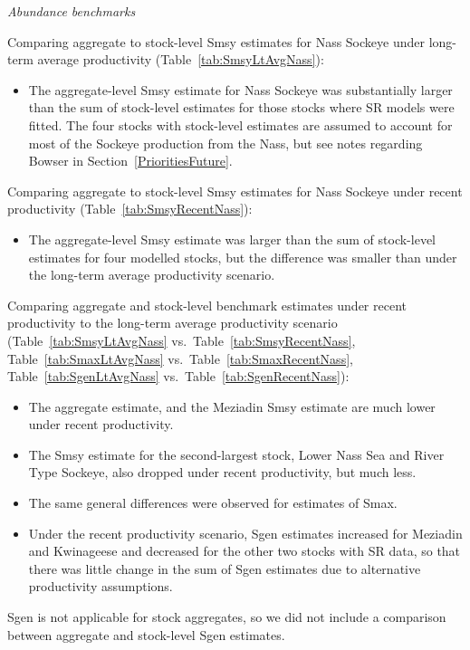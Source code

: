\documentclass[french,11pt]{book}
\begin{document}
\emph{Abundance benchmarks}

Comparing aggregate to stock-level Smsy estimates for Nass Sockeye under long-term average productivity (Table~\ref{tab:SmsyLtAvgNass}):
\begin{itemize}

\item
  The aggregate-level Smsy estimate for Nass Sockeye was substantially larger than the sum of stock-level estimates for those stocks where SR models were fitted. The four stocks with stock-level estimates are assumed to account for most of the Sockeye production from the Nass, but see notes regarding Bowser in Section~\ref{PrioritiesFuture}.
\end{itemize}
Comparing aggregate to stock-level Smsy estimates for Nass Sockeye under recent productivity (Table~\ref{tab:SmsyRecentNass}):
\begin{itemize}

\item
  The aggregate-level Smsy estimate was larger than the sum of stock-level estimates for four modelled stocks, but the difference was smaller than under the long-term average productivity scenario.
\end{itemize}
Comparing aggregate and stock-level benchmark estimates under recent productivity to the long-term average productivity scenario (Table~\ref{tab:SmsyLtAvgNass} vs.~Table~\ref{tab:SmsyRecentNass}, Table~\ref{tab:SmaxLtAvgNass} vs.~Table~\ref{tab:SmaxRecentNass}, Table~\ref{tab:SgenLtAvgNass} vs.~Table~\ref{tab:SgenRecentNass}):
\begin{itemize}

\item
  The aggregate estimate, and the Meziadin Smsy estimate are much lower under recent productivity.
\item
  The Smsy estimate for the second-largest stock, Lower Nass Sea and River Type Sockeye, also dropped under recent productivity, but much less.\\
\item
  The same general differences were observed for estimates of Smax.
\item
  Under the recent productivity scenario, Sgen estimates increased for Meziadin and Kwinageese and decreased for the other two stocks with SR data, so that there was little change in the sum of Sgen estimates due to alternative productivity assumptions.
\end{itemize}
Sgen is not applicable for stock aggregates, so we did not include a comparison between aggregate and stock-level Sgen estimates.
\end{document}
